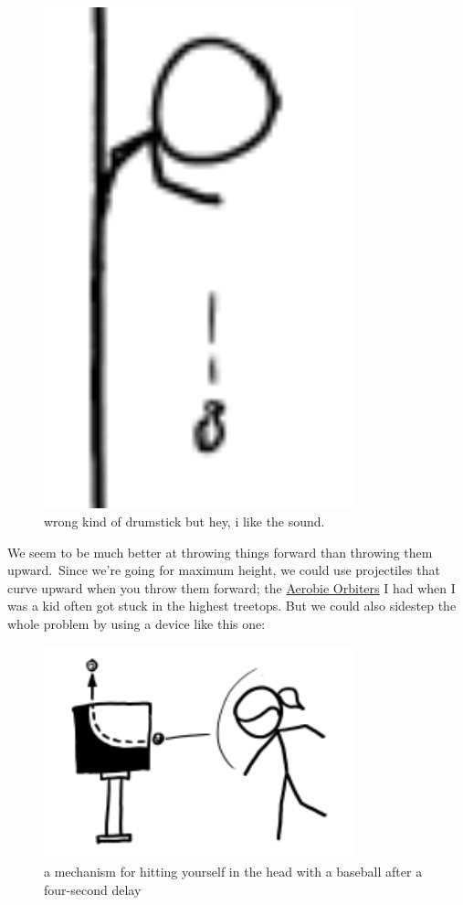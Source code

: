 {\begin{figure}[!htbp]
\centering
\includegraphics[scale=0.5, max width=0.8\textwidth]{imgs/a/44/high_throw_drumstick.png}
\caption{wrong kind of drumstick but hey, i like the sound.}
\end{figure}

{We seem to be much better at throwing things forward than throwing them upward. Since we’re going for maximum height, we could use projectiles that curve upward when you throw them forward; the \href{http://aerobie.com/products/orbiter.htm}{Aerobie Orbiters} I had when I was a kid often got stuck in the highest treetops. But we could also sidestep the whole problem by using a device like this one:}

\begin{figure}[!htbp]
\centering
\includegraphics[scale=0.5, max width=0.8\textwidth]{imgs/a/44/high_throw_redirector.png}
\caption{a mechanism for hitting yourself in the head with a baseball after a four-second delay}
\end{figure}

}

